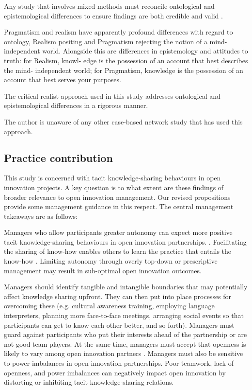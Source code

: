 Any study that involves mixed methods must reconcile ontological and epistemological differences to ensure findings are both credible and valid \citep{bhaskar2013realist}. 

Pragmatism and realism have apparently profound differences with regard to ontology, Realism positing and Pragmatism rejecting the notion of a mind-independent world. Alongside this are differences in epistemology and attitudes to truth: for Realism, knowl- edge is the possession of an account that best describes the mind- independent world; for Pragmatism, knowledge is the possession of an account that best serves your purposes.


The critical realist approach used in this study addresses ontological and epistemological differences in a rigorous manner. 


The author is unaware of any other case-based network study that has used this approach.
\subsection{Practice contribution}

This study is concerned with tacit knowledge-sharing behaviours in open innovation projects. A key question is to what extent are these findings of broader relevance to open innovation management. Our revised propositions provide some management guidance in this respect. The central management takeaways are as follows: \medskip

Managers who allow participants greater autonomy can expect more positive tacit knowledge-sharing behaviours in open innovation partnerships. \citep{gagne2005self,gagne2009model,longo2017struggling}. Facilitating the sharing of know-how enables others to learn the practice that entails the know-how \citep{cook1999bridging}. Limiting autonomy through overly top-down or prescriptive management may result in sub-optimal open innovation outcomes. \medskip

Managers should identify tangible and intangible boundaries that may potentially affect knowledge sharing upfront. They can then put into place processes for overcoming these (e.g. cultural awareness training, employing language interpreters, planning more face-to-face meetings, arranging social events so that participants can get to know each other better, and so forth). Managers must guard against participants who put their interests ahead of the partnership or are not good team players. At the same time, managers must accept that openness is likely to vary among open innovation partners \citep{dahlander2010open}. Managers must also be sensitive to power imbalances in open innovation partnerships. Poor teamwork, lack of openness, and power imbalances can negatively impact open innovation by distorting or inhibiting tacit knowledge-sharing relations.  \medskip

